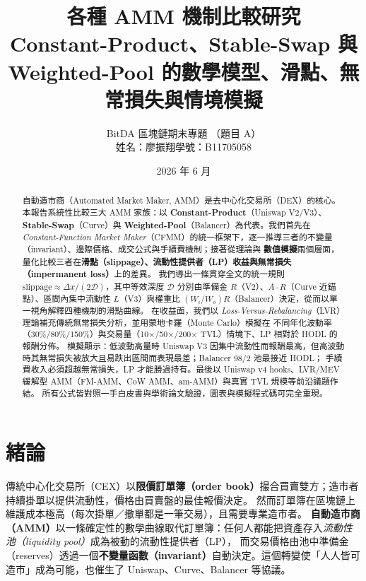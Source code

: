 \documentclass[11pt,a4paper]{article}
\title{\textbf{各種 AMM 機制比較研究}\\[4pt]
\large Constant-Product、Stable-Swap 與 Weighted-Pool 的數學模型、滑點、無常損失與情境模擬}
\author{BitDA 區塊鏈期末專題 \quad（題目 A）\\[2pt]
\small 姓名：廖振翔\quad 學號：B11705058}
\date{2026 年 6 月}
\begin{document}
\maketitle
\thispagestyle{fancy}

\begin{abstract}\noindent
自動造市商（Automated Market Maker, AMM）是去中心化交易所（DEX）的核心。本報告系統性比較三大 AMM 家族：以
\textbf{Constant-Product}（Uniswap V2/V3）、\textbf{Stable-Swap}（Curve）與
\textbf{Weighted-Pool}（Balancer）為代表。我們首先在
\emph{Constant-Function Market Maker}（CFMM）的統一框架下，逐一推導三者的不變量（invariant）、邊際價格、成交公式與手續費機制；接著從理論與
\textbf{數值模擬}兩個層面，量化比較三者在\textbf{滑點（slippage）、流動性提供者（LP）收益與無常損失（impermanent loss）}上的差異。
我們導出一條貫穿全文的統一規則
$\text{slippage}\approx \Delta x/(2\mathcal{D})$，其中等效深度 $\mathcal{D}$ 分別由準備金 $R$（V2）、$A\cdot R$（Curve 近錨點）、區間內集中流動性 $L$（V3）與權重比 $(W_i/W_o)R$（Balancer）決定，從而以單一視角解釋四種機制的滑點曲線。
在收益面，我們以
\emph{Loss-Versus-Rebalancing}（LVR）理論補充傳統無常損失分析，並用蒙地卡羅（Monte Carlo）模擬在
不同年化波動率（30\%/80\%/150\%）與交易量（10$\times$/50$\times$/200$\times$ TVL）情境下、LP 相對於 HODL 的報酬分佈。
模擬顯示：低波動高量時 Uniswap V3 因集中流動性而報酬最高，但高波動時其無常損失被放大且易跌出區間而表現最差；Balancer 98/2 池最接近 HODL；
手續費收入必須超越無常損失，LP 才能勝過持有。最後以 Uniswap v4 hooks、LVR/MEV 緩解型 AMM（FM-AMM、CoW AMM、am-AMM）與真實 TVL 規模等前沿議題作結。
所有公式皆對照一手白皮書與學術論文驗證，圖表與模擬程式碼可完全重現。
\end{abstract}

{\small\tableofcontents}
\bigskip

\section{緒論}
傳統中心化交易所（CEX）以\textbf{限價訂單簿（order book）}撮合買賣雙方；造市者持續掛單以提供流動性，價格由買賣盤的最佳報價決定。
然而訂單簿在區塊鏈上維護成本極高（每次掛單／撤單都是一筆交易），且需要專業造市者。
\textbf{自動造市商（AMM）}以一條確定性的數學曲線取代訂單簿：任何人都能把資產存入\emph{流動性池（liquidity pool）}成為被動的流動性提供者（LP），
而交易價格由池中準備金（reserves）透過一個\textbf{不變量函數（invariant）}自動決定。這個轉變使「人人皆可造市」成為可能，也催生了 Uniswap、Curve、Balancer 等協議。
\end{document}
